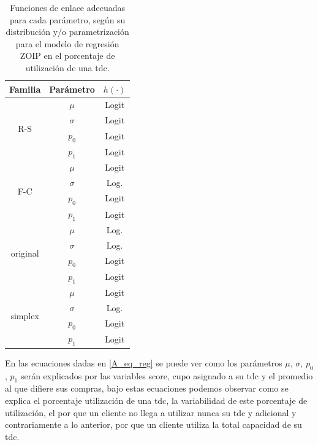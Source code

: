 \begin{table}[!hbt]
{\scriptsize
\begin{center}
\begin{tabular}{|c|c|c|}\hline
Familia & Par\'{a}metro & $h(\cdot)$ \\ \hline
\multirow{4}{*}{R-S} & $\mu$ & Logit \\
 & $\sigma$ & Logit \\
 & $p_0$ & Logit \\
 & $p_1$ & Logit \\ \hline

\multirow{4}{*}{F-C} & $\mu$ & Logit \\
 & $\sigma$ & Log. \\
 & $p_0$ & Logit \\
 & $p_1$ & Logit \\ \hline

\multirow{4}{*}{original} & $\mu$ & Log. \\
 & $\sigma$ & Log. \\
 & $p_0$ & Logit \\
 & $p_1$ & Logit \\ \hline

\multirow{4}{*}{simplex} & $\mu$ & Logit \\
 & $\sigma$ & Log. \\
 & $p_0$ & Logit \\
 & $p_1$ & Logit \\ \hline

\end{tabular}
\caption{Funciones de enlace adecuadas para cada par\'{a}metro, seg\'{u}n su distribuci\'{o}n y/o parametrizaci\'{o}n para el modelo de regresi\'{o}n ZOIP en el porcentaje de utilizaci\'{o}n de una tdc.}
\label{T_F_enlace2}
\end{center}
}
\end{table}

En las ecuaciones dadas en \eqref{A_eq_reg} se puede ver como los par\'{a}metros $\mu$, $\sigma$, $p_0$, $p_1$ ser\'{a}n explicados por las variables score, cupo asignado a su tdc y el promedio al que difiere sus compras, bajo estas ecuaciones podemos observar como se explica el porcentaje utilizaci\'{o}n de una tdc, la variabilidad de este porcentaje de utilizaci\'{o}n, el por que un cliente no llega a utilizar nunca su tdc y adicional y contrariamente a lo anterior, por que un cliente utiliza la total capacidad de su tdc.\\

